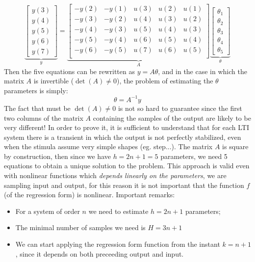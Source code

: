 \begin{equation}
    \underbrace{\begin{bmatrix}
        y(3)\\
        y(4)\\
        y(5)\\
        y(6)\\
        y(7)
    \end{bmatrix}}_{y} = \underbrace{\begin{bmatrix}
        -y(2)&-y(1)&u(3)&u(2)&u(1)\\
        -y(3)&-y(2)&u(4)&u(3)&u(2)\\
        -y(4)&-y(3)&u(5)&u(4)&u(3)\\
        -y(5)&-y(4)&u(6)&u(5)&u(4)\\
        -y(6)&-y(5)&u(7)&u(6)&u(5)\\
    \end{bmatrix}}_{A}\underbrace{\begin{bmatrix}
        \theta_1\\
        \theta_2\\
        \theta_3\\
        \theta_4\\
        \theta_5
    \end{bmatrix}}_{\theta}
\end{equation}
Then the five equations can be rewritten as $y=A\theta$, and in the case in which the matrix $A$ is invertible ($\det(A)\ne0$), the problem of estimating the $\theta$ parameters is simply:
\begin{equation}
    \theta=A^{-1}{y}
\end{equation}
The fact that must be $\det(A)\ne0$ is not so hard to guarantee since the first two columns of the matrix $A$ containing the samples of the output are likely to be very different! In order to prove it, it is sufficient to understand that for each LTI system there is a transient in which the output is not perfectly stabilized, even when the stimula assume very simple shapes (eg. step...). The matrix $A$ is square by construction, then since we have $h=2n+1=5$ parameters, we need 5 equations to obtain a unique solution to the problem. This approach is valid even with nonlinear functions which \textit{depends linearly on the parameters}, we are sampling input and output, for this reason it is not important that the function $f$ (of the regression form) is nonlinear. Important remarks: 
\begin{itemize}
    \item For a system of order $n$ we need to estimate $h=2n+1$ parameters; 
    \item The minimal number of samples we need is $H=3n+1$
    \item We can start applying the regression form function from the instant $k=n+1$, since it depends on both preceeding output and input.
\end{itemize}

